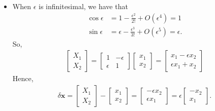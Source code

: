 \documentclass[10pt]{article}
\newcommand{\ve}[1]{\mathbf{#1}}
\begin{document}
\begin{itemize}
    \item When $\epsilon$ is infinitesimal, we have that
    \begin{align*}
      \cos \epsilon &= 1 - \frac{\epsilon^2}{2!} + O(\epsilon^4) = 1\\
      \sin \epsilon &= \epsilon - \frac{\epsilon^3}{3!} + O(\epsilon^5) = \epsilon.
    \end{align*}
    So,
    \begin{align*}
      \begin{bmatrix}
        X_1 \\ X_2
      \end{bmatrix}
      =
      \begin{bmatrix}
        1 & -\epsilon \\
        \epsilon & 1
      \end{bmatrix}
      \begin{bmatrix}
        x_1 \\ x_2
      \end{bmatrix}
      =
      \begin{bmatrix}
        x_1 - \epsilon x_2 \\
        \epsilon x_1 + x_2
      \end{bmatrix}
    \end{align*}
    Hence,
    \begin{align*}
      \delta \ve{x}
      =
      \begin{bmatrix}
        X_1 \\ X_2
      \end{bmatrix}
      -
      \begin{bmatrix}
        x_1 \\ x_2
      \end{bmatrix} 
      =
      \begin{bmatrix}
        -\epsilon x_2 \\ \epsilon x_1
      \end{bmatrix}
      = \epsilon \begin{bmatrix}
        -x_2 \\ x_1
      \end{bmatrix}.
    \end{align*}


\end{itemize}
\end{document}

